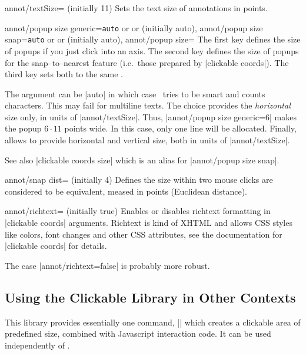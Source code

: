 \begin{pgfplotskey}{annot/textSize= (initially 11)}
	Sets the text size of annotations in points.
\end{pgfplotskey}

\begin{pgfplotskeylist}{%
	annot/popup size generic=\texttt{auto} or  or  (initially auto),%
	annot/popup size snap=\texttt{auto} or  or  (initially auto),%
	annot/popup size=}%
	The first key defines the size of popups if you just click into an axis. The second key defines the size of popups for the snap--to--nearest feature (i.e.\ those prepared by |clickable coords|). The third key sets both to the same .

	The argument can be |auto| in which case \PGFPlots\ tries to be smart and counts characters. This may fail for multiline texts. The choice  provides the \emph{horizontal} size only, in units of |annot/textSize|. Thus, |annot/popup size generic=6| makes the popup $6\cdot 11$ points wide. In this case, only one line will be allocated. Finally,  allows to provide horizontal and vertical size, both in units of |annot/textSize|.

	See also |clickable coords size| which is an alias for |annot/popup size snap|.
\end{pgfplotskeylist}


\begin{pgfplotskey}{annot/snap dist= (initially 4)}
	Defines the size within two mouse clicks are considered to be equivalent, meased in points (Euclidean distance).
\end{pgfplotskey}

\begin{pgfplotskey}{annot/richtext= (initially true)}
	Enables or disables richtext formatting in |clickable coords| arguments. Richtext is kind of XHTML and allows CSS styles like colors, font changes and other CSS attributes, see the documentation for |clickable coords| for details.

	The case |annot/richtext=false| is probably more robust.
\end{pgfplotskey}

\subsection{Using the Clickable Library in Other Contexts}
This library provides essentially one command, |\pgfplotsclickablecreate| which creates a clickable area of predefined size, combined with Javascript interaction code. It can be used independently of \PGFPlots.

